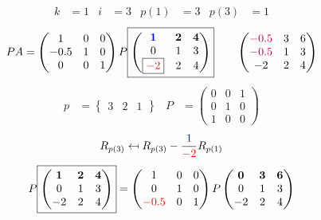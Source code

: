 \documentclass[pdf]{beamer}
\begin{document}
\begin{frame}{}\begin{align*} k &= 1 & i &= 3 & p(1) &= 3 & p(3) &= 1\end{align*} $$PA=\begin{pmatrix}1&0&0\\-0.5&1&0\\0&0&1\end{pmatrix} P \boxed{\begin{pmatrix}\mathbf{{\color{blue}1}}&\mathbf{2}&\mathbf{4}\\0&1&3\\\boxed{{\color{red}-2}}&2&4\end{pmatrix}} \quad\quad \begin{pmatrix}{\color{purple}-0.5}&3&6\\{\color{purple}-0.5}&1&3\\-2&2&4\end{pmatrix}$$ \begin{align*} p&= \begin{Bmatrix}3&2&1\end{Bmatrix} & P&= \begin{pmatrix}0&0&1\\0&1&0\\1&0&0\end{pmatrix} \end{align*} $$R_{p(3)} \mapsfrom R_{p(3)} - \frac{{\color{blue}1}}{{\color{red}-2}} R_{p(1)}$$ $$ P \boxed{\begin{pmatrix}\mathbf{1}&\mathbf{2}&\mathbf{4}\\0&1&3\\-2&2&4\end{pmatrix}} = \begin{pmatrix}1&0&0\\0&1&0\\{\color{red}-0.5}&0&1\end{pmatrix} P \begin{pmatrix}\mathbf{0}&\mathbf{3}&\mathbf{6}\\0&1&3\\-2&2&4\end{pmatrix} $$\end{frame}
\end{document}

